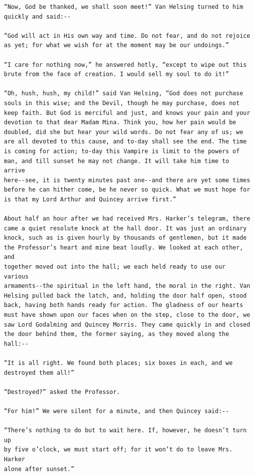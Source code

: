 \documentclass{article}
\begin{document}
\begin{verbatim}
“Now, God be thanked, we shall soon meet!” Van Helsing turned to him
quickly and said:--

“God will act in His own way and time. Do not fear, and do not rejoice
as yet; for what we wish for at the moment may be our undoings.”

“I care for nothing now,” he answered hotly, “except to wipe out this
brute from the face of creation. I would sell my soul to do it!”

“Oh, hush, hush, my child!” said Van Helsing, “God does not purchase
souls in this wise; and the Devil, though he may purchase, does not
keep faith. But God is merciful and just, and knows your pain and your
devotion to that dear Madam Mina. Think you, how her pain would be
doubled, did she but hear your wild words. Do not fear any of us; we
are all devoted to this cause, and to-day shall see the end. The time
is coming for action; to-day this Vampire is limit to the powers of
man, and till sunset he may not change. It will take him time to arrive
here--see, it is twenty minutes past one--and there are yet some times
before he can hither come, be he never so quick. What we must hope for
is that my Lord Arthur and Quincey arrive first.”

About half an hour after we had received Mrs. Harker’s telegram, there
came a quiet resolute knock at the hall door. It was just an ordinary
knock, such as is given hourly by thousands of gentlemen, but it made
the Professor’s heart and mine beat loudly. We looked at each other, and
together moved out into the hall; we each held ready to use our various
armaments--the spiritual in the left hand, the moral in the right. Van
Helsing pulled back the latch, and, holding the door half open, stood
back, having both hands ready for action. The gladness of our hearts
must have shown upon our faces when on the step, close to the door, we
saw Lord Godalming and Quincey Morris. They came quickly in and closed
the door behind them, the former saying, as they moved along the hall:--

“It is all right. We found both places; six boxes in each, and we
destroyed them all!”

“Destroyed?” asked the Professor.

“For him!” We were silent for a minute, and then Quincey said:--

“There’s nothing to do but to wait here. If, however, he doesn’t turn up
by five o’clock, we must start off; for it won’t do to leave Mrs. Harker
alone after sunset.”


\end{verbatim}
\end{document}
